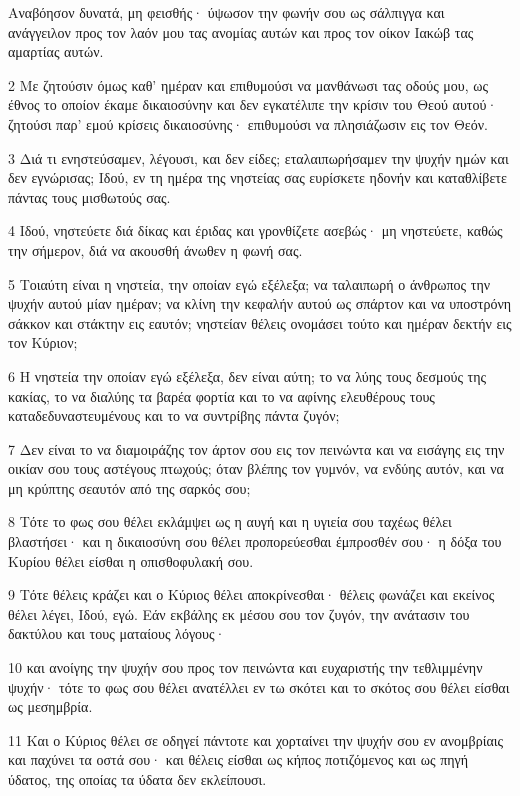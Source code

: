 \par Αναβόησον δυνατά, μη φεισθής· ύψωσον την φωνήν σου ως σάλπιγγα και ανάγγειλον προς τον λαόν μου τας ανομίας αυτών και προς τον οίκον Ιακώβ τας αμαρτίας αυτών.
\par 2 Με ζητούσιν όμως καθ' ημέραν και επιθυμούσι να μανθάνωσι τας οδούς μου, ως έθνος το οποίον έκαμε δικαιοσύνην και δεν εγκατέλιπε την κρίσιν του Θεού αυτού· ζητούσι παρ' εμού κρίσεις δικαιοσύνης· επιθυμούσι να πλησιάζωσιν εις τον Θεόν.
\par 3 Διά τι ενηστεύσαμεν, λέγουσι, και δεν είδες; εταλαιπωρήσαμεν την ψυχήν ημών και δεν εγνώρισας; Ιδού, εν τη ημέρα της νηστείας σας ευρίσκετε ηδονήν και καταθλίβετε πάντας τους μισθωτούς σας.
\par 4 Ιδού, νηστεύετε διά δίκας και έριδας και γρονθίζετε ασεβώς· μη νηστεύετε, καθώς την σήμερον, διά να ακουσθή άνωθεν η φωνή σας.
\par 5 Τοιαύτη είναι η νηστεία, την οποίαν εγώ εξέλεξα; να ταλαιπωρή ο άνθρωπος την ψυχήν αυτού μίαν ημέραν; να κλίνη την κεφαλήν αυτού ως σπάρτον και να υποστρόνη σάκκον και στάκτην εις εαυτόν; νηστείαν θέλεις ονομάσει τούτο και ημέραν δεκτήν εις τον Κύριον;
\par 6 Η νηστεία την οποίαν εγώ εξέλεξα, δεν είναι αύτη; το να λύης τους δεσμούς της κακίας, το να διαλύης τα βαρέα φορτία και το να αφίνης ελευθέρους τους καταδεδυναστευμένους και το να συντρίβης πάντα ζυγόν;
\par 7 Δεν είναι το να διαμοιράζης τον άρτον σου εις τον πεινώντα και να εισάγης εις την οικίαν σου τους αστέγους πτωχούς; όταν βλέπης τον γυμνόν, να ενδύης αυτόν, και να μη κρύπτης σεαυτόν από της σαρκός σου;
\par 8 Τότε το φως σου θέλει εκλάμψει ως η αυγή και η υγιεία σου ταχέως θέλει βλαστήσει· και η δικαιοσύνη σου θέλει προπορεύεσθαι έμπροσθέν σου· η δόξα του Κυρίου θέλει είσθαι η οπισθοφυλακή σου.
\par 9 Τότε θέλεις κράζει και ο Κύριος θέλει αποκρίνεσθαι· θέλεις φωνάζει και εκείνος θέλει λέγει, Ιδού, εγώ. Εάν εκβάλης εκ μέσου σου τον ζυγόν, την ανάτασιν του δακτύλου και τους ματαίους λόγους·
\par 10 και ανοίγης την ψυχήν σου προς τον πεινώντα και ευχαριστής την τεθλιμμένην ψυχήν· τότε το φως σου θέλει ανατέλλει εν τω σκότει και το σκότος σου θέλει είσθαι ως μεσημβρία.
\par 11 Και ο Κύριος θέλει σε οδηγεί πάντοτε και χορταίνει την ψυχήν σου εν ανομβρίαις και παχύνει τα οστά σου· και θέλεις είσθαι ως κήπος ποτιζόμενος και ως πηγή ύδατος, της οποίας τα ύδατα δεν εκλείπουσι.
